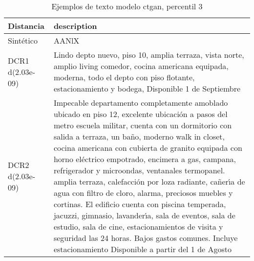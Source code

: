 \begin{table}[H]
\centering
\fontsize{10}{14}\selectfont
\caption{Ejemplos de texto modelo ctgan, percentil 3}
\label{table-example-economicos-b-2-ctgan-3p-text}
\begin{tabular}{|l|m{35em}|}
\hline
\rowcolor[gray]{0.8}
Distancia & description \\
\hline Sintético & AANlX \\
\hline DCR1 d(2.03e-09) & Lindo depto nuevo, piso 10, amplia terraza, vista norte, amplio living comedor, cocina americana equipada, moderna, todo el depto con piso flotante, estacionamiento y bodega, Disponible 1 de Septiembre \\
\hline DCR2 d(2.03e-09) & Impecable departamento completamente amoblado ubicado en piso 12, excelente ubicaci\'on a pasos del metro escuela militar, cuenta con un dormitorio con salida a terraza, un ba\~no, moderno walk in closet, cocina americana con cubierta de granito equipada con horno el\'ectrico empotrado, encimera a gas, campana, refrigerador y microondas, ventanales termopanel. amplia terraza, calefacci\'on por loza radiante, ca\~ner{\'\i}a de agua con filtro de cloro, alarma, preciosos muebles y cortinas.
El edificio cuenta con piscina temperada, jacuzzi, gimnasio, lavander{\'\i}a, sala de eventos, sala de estudio, sala de cine, estacionamientos de visita y seguridad las 24 horas. Bajos gastos comunes.
Incluye estacionamiento
Disponible a partir del 1 de Agosto \\
\hline
\end{tabular}
\end{table}
